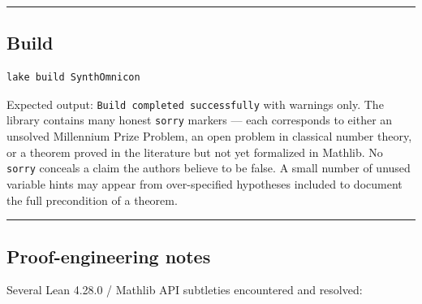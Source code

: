 \documentclass[11pt,a4paper]{article}
\begin{document}
\begin{center}
\rule{0.5\textwidth}{0.4pt}
\end{center}

\subsection{Build}

\begin{lstlisting}[language=bash]
lake build SynthOmnicon
\end{lstlisting}

Expected output: \texttt{Build completed successfully} with warnings only. The library contains many
honest \texttt{sorry} markers --- each corresponds to either an unsolved Millennium Prize Problem,
an open problem in classical number theory, or a theorem proved in the literature but not
yet formalized in Mathlib. No \texttt{sorry} conceals a claim the authors believe to be false.
A small number of unused variable hints may appear from over-specified hypotheses included
to document the full precondition of a theorem.

\begin{center}
\rule{0.5\textwidth}{0.4pt}
\end{center}

\subsection{Proof-engineering notes}

Several Lean 4.28.0 / Mathlib API subtleties encountered and resolved:
\end{document}
